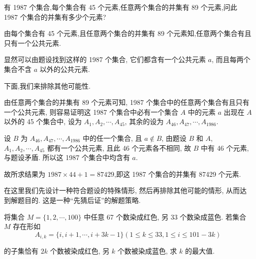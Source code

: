 \begin{example}
	有 1987 个集合,每个集合有 45 个元素,任意两个集合的并集有 89 个元素,问此 1987 个集合的并集有多少个元素?
\end{example}

\begin{analysis}
	由每个集合有 45 个元素,且任意两个集合的并集有 89 个元素知,任意两个集合有且只有一个公共元素.
\end{analysis}

\begin{solution}
	显然可以由题设找到这样的 1987 个集合, 它们都含有一个公共元素 $a$, 而且每两个集合不含 $a$ 以外的公共元素.

	下面,我们来排除其他可能性.

	由任意两个集合的并集有 89 个元素可知, 1987 个集合中的任意两个集合有且只有一个公共元素, 则容易证明这 1987 个集合中必有一个集合 $A$ 中的元素 $a$ 出现在 $A$ 以外的 45 个集合中, 设为 $A_{1}, A_{2}, \cdots, A_{45}$, 其余的设为 $A_{46}, A_{47}, \cdots, A_{1986}$.

	设 $B$ 为 $A_{46}, A_{47}, \cdots, A_{1986}$ 中的任一个集合, 且 $a \notin B$, 由题设 $B$ 和 $A$, $A_{1}, A_{2}, \cdots, A_{45}$ 都有一个公共元素, 且此 46 个元素各不相同, 故 $B$ 中有 46 个元素,与题设矛盾. 所以这 1987 个集合中均含有 $a$.

	故所求结果为 $1987 \times 44+1=87429$,即这 1987 个集合的并集有 87429 个元素.
\end{solution}

\begin{note}
	在这里我们先设计一种符合题设的特殊情形, 然后再排除其他可能的情形, 从而达到解题目的. 这是一种“先猜后证”的解题策略.
\end{note}

\begin{example}
	将集合 $M=\{1,2, \cdots, 100\}$ 中任意 67 个数染成红色, 另 33 个数染成蓝色. 若集合 $M$ 存在形如
	$$
		A_{i, k}=\{i, i+1, \cdots, i+3 k-1\}(1 \leqslant k \leqslant 33,1 \leqslant i \leqslant 101-3 k)
	$$

	的子集恰有 $2 k$ 个数被染成红色, 另 $k$ 个数被染成蓝色, 求 $k$ 的最大值.
\end{example}

